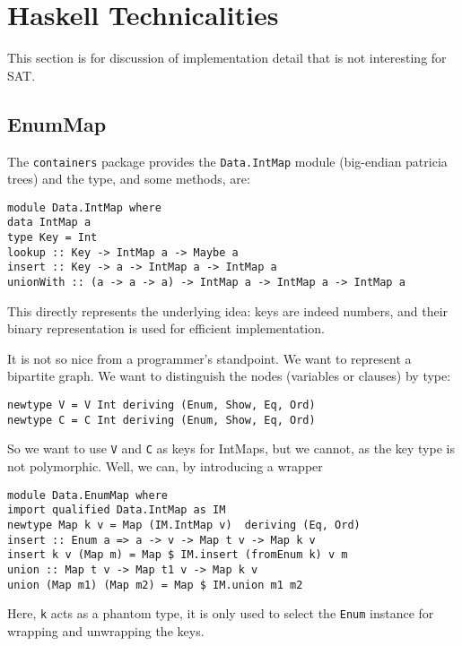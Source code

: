 \section{Haskell Technicalities}

This section is for discussion of implementation detail
that is not interesting for SAT.

\subsection{EnumMap}

The \verb|containers| package provides the \verb|Data.IntMap| module
(big-endian patricia trees) and the type, and some methods, are:
\begin{verbatim}
module Data.IntMap where
data IntMap a
type Key = Int
lookup :: Key -> IntMap a -> Maybe a 
insert :: Key -> a -> IntMap a -> IntMap a 
unionWith :: (a -> a -> a) -> IntMap a -> IntMap a -> IntMap a 
\end{verbatim}
This directly represents the underlying idea: keys are indeed numbers,
and their binary representation is used for efficient implementation.

It is not so nice from a programmer's standpoint.
We want to represent a bipartite graph.
We want to distinguish the nodes (variables or clauses) by type:
\begin{verbatim}
newtype V = V Int deriving (Enum, Show, Eq, Ord)
newtype C = C Int deriving (Enum, Show, Eq, Ord)
\end{verbatim}
So we want to use \verb|V| and \verb|C| as keys for IntMaps,
but we cannot, as the key type is not polymorphic.
Well, we can, by introducing a wrapper
\begin{verbatim}
module Data.EnumMap where
import qualified Data.IntMap as IM
newtype Map k v = Map (IM.IntMap v)  deriving (Eq, Ord)
insert :: Enum a => a -> v -> Map t v -> Map k v
insert k v (Map m) = Map $ IM.insert (fromEnum k) v m
union :: Map t v -> Map t1 v -> Map k v
union (Map m1) (Map m2) = Map $ IM.union m1 m2
\end{verbatim}
Here, \verb|k| acts as a phantom type, it is only used 
to select the \verb|Enum| instance for wrapping and unwrapping the keys.
